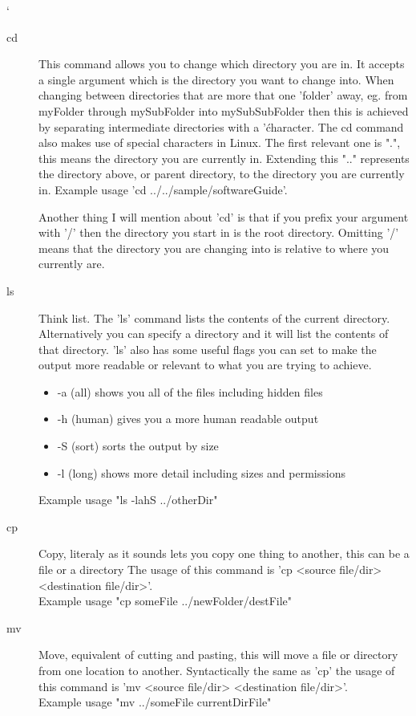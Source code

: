 `\documentclass[a4paper,11pt]{report}
\begin{document}
			\begin{description}
				\item[cd]
					This command allows you to change which directory you are in.
					It accepts a single argument which is the directory you want to change into.
					When changing between directories that are more that one 'folder' away, eg. from myFolder through mySubFolder into mySubSubFolder then this is achieved by separating intermediate directories with a '\' character.
					The cd command also makes use of special characters in Linux.
					The first relevant one is ".", this means the directory you are currently in.
					Extending this ".." represents the directory above, or parent directory, to the directory you are currently in.
					Example usage 'cd ../../sample/softwareGuide'.

					Another thing I will mention about 'cd' is that if you prefix your argument with '/' then the directory you start in is the root directory.
					Omitting '/' means that the directory you are changing into is relative to where you currently are.

				\item[ls]
					Think list. The 'ls' command lists the contents of the current directory.
					Alternatively you can specify a directory and it will list the contents of that directory.
					'ls' also has some useful flags you can set to make the output more readable or relevant to what you are trying to achieve.
					\begin{itemize}
						\item -a (all) shows you all of the files including hidden files
						\item -h (human) gives you a more human readable output
						\item -S (sort) sorts the output by size
						\item -l (long) shows more detail including sizes and permissions
					\end{itemize}
					Example usage "ls -lahS ../otherDir"

				\item[cp]
					Copy, literaly as it sounds lets you copy one thing to another, this can be a file or a directory
					The usage of this command is 'cp <source file/dir> <destination file/dir>'.
					\\Example usage "cp someFile ../newFolder/destFile"

				\item[mv]
					Move, equivalent of cutting and pasting, this will move a file or directory from one location to another.
					Syntactically the same as 'cp' the usage of this command is 'mv <source file/dir> <destination file/dir>'.\\
					Example usage "mv ../someFile currentDirFile"


\end{description}
\end{document}
